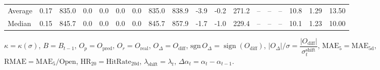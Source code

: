 \begin{threeparttable}
{\begin{tabular}{lrrrrrrrrrrrrrrrrr}
Average &     0.17 & 835.0 &               0.0 &               0.0 &                0.0 &                0.0 & 835.0 & 838.9 &       -3.9 &                     -0.2 &               271.2 &         -- &        -- &             -- &             10.8 &            1.29 &                  13.50 \\
 Median &     0.15 & 845.7 &               0.0 &               0.0 &                0.0 &                0.0 & 845.7 & 857.9 &       -1.7 &                     -1.0 &               229.4 &         -- &        -- &             -- &             10.1 &            1.23 &                  10.00 \\
\bottomrule
\end{tabular}
}
\begin{tablenotes}\footnotesize
\item $\kappa=\kappa(\sigma)$, $B=B_{t-1}$, $O_p=O_{\text{pred}}$, $O_r=O_{\text{real}}$, $O_\Delta=O_{\text{diff}}$, $\mathrm{sgn}\,O_\Delta=\operatorname{sign}(O_{\text{diff}})$, $|O_\Delta|/\sigma=\dfrac{|O_{\text{diff}}|}{\sigma_t^{\text{shift}}}$, $\mathrm{MAE}_5=\mathrm{MAE}_{5\text{d}}$, $\mathrm{RMAE}= \mathrm{MAE}_5 / \text{Open}$, $\mathrm{HR}_{20}=\mathrm{HitRate}_{20\text{d}}$, 
$\lambda_{\text{shift}}=\lambda_t$, 
$\Delta\alpha_t=\alpha_t-\alpha_{t-1}$.
\end{tablenotes}
\end{threeparttable}
\endgroup

